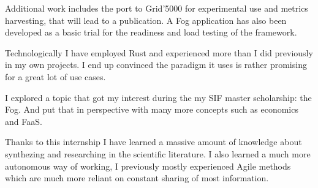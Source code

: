 Additional work includes the port to Grid'5000 for experimental use and metrics harvesting, that will lead to a publication. A Fog application has also been developed as a basic trial for the readiness and load testing of the framework.


\varthreestars

Technologically I have employed Rust and experienced more than I did previously in my own projects. I end up convinced the paradigm it uses is rather promising for a great lot of use cases.

I explored a topic that got my interest during the my SIF master scholarship: the Fog. And put that in perspective with many more concepts such as economics and \gls{FaaS}.

Thanks to this internship I have learned a massive amount of knowledge about synthezing and researching in the scientific literature. I also learned a much more autonomous way of working, I previously mostly experienced Agile methods which are much more reliant on constant sharing of most information.